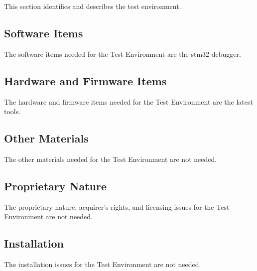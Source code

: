 


This section identifies and describes the \TestEnvName\xspace test environment.

\subsection{Software Items}
\label{loc:Software\TestEnvName}


The software items needed for the \TestEnvName\xspace Test Environment are the stm32 debugger.


\subsection{Hardware and Firmware Items}
\label{loc:Hardware\TestEnvName}


The hardware and firmware items needed for the \TestEnvName\xspace Test Environment are the latest tools.


\subsection{Other Materials}
\label{loc:OtherMaterials\TestEnvName}


The other materials needed for the \TestEnvName\xspace Test Environment are not needed.


\subsection{Proprietary Nature}
\label{loc:ProprietaryNature\TestEnvName}


The proprietary nature, acquirer’s rights, and licensing issues for the \TestEnvName\xspace Test Environment are not needed.


\subsection{Installation}
\label{loc:Installation\TestEnvName}


The installation issues for the \TestEnvName\xspace Test Environment are not needed.


